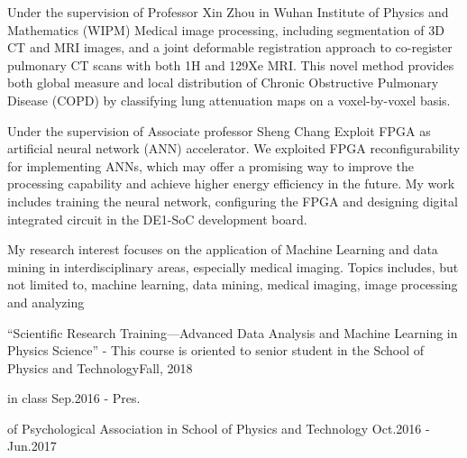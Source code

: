 \documentclass{resume}
\begin{document}
{Under the supervision of Professor Xin Zhou in Wuhan Institute of Physics and Mathematics (WIPM)}
{\textcolor[RGB]{172,0,230}{Medical image processing}, including segmentation of 3D CT and MRI images, and a joint deformable registration approach to co-register pulmonary CT scans with both 1H and 129Xe MRI. This novel method provides both global measure and local distribution of Chronic Obstructive Pulmonary Disease (COPD) by classifying lung attenuation maps on a voxel-by-voxel basis.}

{Under the supervision of Associate professor Sheng Chang}
{\textcolor[RGB]{172,0,230}{Exploit FPGA as artificial neural network (ANN) accelerator}. We exploited FPGA reconfigurability for implementing ANNs, which may offer a promising way to improve the processing capability and achieve higher energy efficiency in the future. My work includes training the neural network, configuring the FPGA and designing digital integrated circuit in the DE1-SoC development board. }




%
My research interest focuses on the application of Machine Learning and data mining in interdisciplinary areas, especially medical imaging. Topics includes, but not limited to, machine learning, data mining, medical imaging, image processing and analyzing




%




%

{“Scientific Research Training---Advanced Data Analysis and Machine Learning in Physics Science” - This course is oriented to senior student in the School of Physics and Technology}{Fall, 2018}

{in class}
{Sep.2016 - Pres.}

{of Psychological Association in School of Physics and Technology}
{Oct.2016 - Jun.2017}
\end{document}
